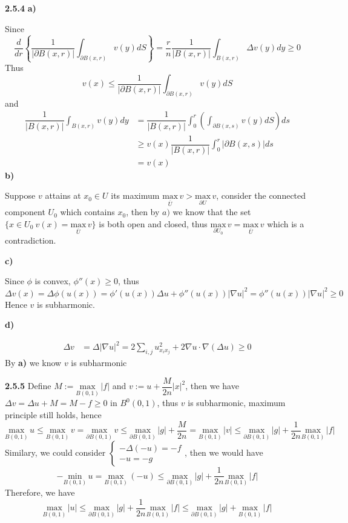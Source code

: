 \documentclass[../main.tex]{subfiles}
\begin{document}
\begin{customproblem}\textbf{2.5.4}
\textbf{a)}\par
Since 
\[
\dfrac{d}{dr}\left\{\dfrac{1}{|\partial B(x,r)|}\int_{\partial B(x,r)}v(y)dS\right\}=\dfrac{r}{n}\dfrac{1}{|B(x,r)|}\int_{B(x,r)}\Delta v(y)dy \geq 0
\]
Thus 
\[
v(x)\leq\dfrac{1}{|\partial B(x,r)|}\int_{\partial B(x,r)}v(y)dS
\]
and
\[
\begin{aligned}
\dfrac{1}{|B(x,r)|}\int_{B(x,r)}v(y)dy
&= \dfrac{1}{|B(x,r)|}\int_{0}^{r}\left(\int_{\partial B(x,s)}v(y)dS\right)ds \\
&\geq v(x)\dfrac{1}{|B(x,r)|}\int_{0}^{r}|\partial B(x,s)|ds \\
&=v(x)
\end{aligned}
\]
\textbf{b)}\par
Suppose $v$ attains at $x_{0}\in U$ its maximum $\underset{\overline{U}}{\mathrm{max}}\,v > \underset{\partial U}{\mathrm{max}}\,v$, consider the connected component $U_{0}$ which contains $x_{0}$,  then by $a)$ we know that the set $\{x\in U_{0}\:v(x)=\underset{\overline{U}}{\mathrm{max}}\,v\}$ is both open and closed, thus $\underset{\partial U_{0}}{\mathrm{max}}\,v=\underset{\overline{U}}{\mathrm{max}}\,v$ which is a contradiction. \par
\textbf{c)}\par
Since $\phi$ is convex, $\phi''(x)\geq 0$, thus
\[
\Delta v(x)=\Delta\phi(u(x))=\phi'(u(x))\Delta u+\phi''(u(x))|\nabla u|^{2}=\phi''(u(x))|\nabla u|^{2}\geq 0
\]
Hence $v$ is subharmonic. \par
\textbf{d)}\par
\[
\begin{aligned}
\Delta v &= \Delta |\nabla u|^{2} =2\sum_{i,j}u_{x_{i}x_{j}}^{2}+2\nabla u\cdot\nabla(\Delta u)\geq 0
\end{aligned}
\]
By \textbf{a)} we know $v$ is subharmonic
\end{customproblem}

\begin{customproblem}\textbf{2.5.5}
Define $M:=\underset{B(0,1)}{\mathrm{max}}\,|f|$ and $v:=u+\dfrac{M}{2n}|x|^{2}$, then we have $\Delta v=\Delta u+M=M-f\geq 0$ in $B^{0}(0,1)$, thus $v$ is subharmonic, maximum principle still holds, hence \[
\underset{B(0,1)}{\mathrm{max}}\,u \leq\underset{B(0,1)}{\mathrm{max}}\,v=\underset{\partial B(0,1)}{\mathrm{max}}\,v\leq \underset{\partial B(0,1)}{\mathrm{max}}\,|g|+\dfrac{M}{2n}=\underset{B(0,1)}{\mathrm{max}}\,|v|\leq \underset{\partial B(0,1)}{\mathrm{max}}\,|g|+\dfrac{1}{2n}\underset{B(0,1)}{\mathrm{max}}\,|f|
\]Similary, we could consider $\left\{\begin{matrix}
-\Delta(-u)=-f\\ 
-u=-g
\end{matrix}\right.$, then we would have $$-\underset{B(0,1)}{\mathrm{min}}\,u=\underset{B(0,1)}{\mathrm{max}}\,(-u)\leq\underset{\partial B(0,1)}{\mathrm{max}}\,|g|+\dfrac{1}{2n}\underset{B(0,1)}{\mathrm{max}}\,|f| $$
Therefore, we have $$\underset{B(0,1)}{\mathrm{max}}\,|u|\leq\underset{\partial B(0,1)}{\mathrm{max}}\,|g|+\dfrac{1}{2n}\underset{B(0,1)}{\mathrm{max}}\,|f|\leq\underset{\partial B(0,1)}{\mathrm{max}}\,|g|+\underset{B(0,1)}{\mathrm{max}}\,|f|$$ 
\end{customproblem}
\end{document}
